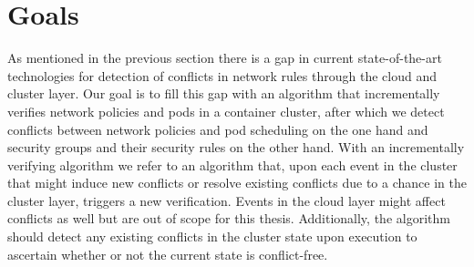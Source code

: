 \section{Goals} \label{sec:goals}
As mentioned in the previous section there is a gap in current state-of-the-art technologies for detection of conflicts in network rules through the cloud and cluster layer. Our goal is to fill this gap with an algorithm that incrementally verifies network policies and pods in a container cluster, after which we detect conflicts between network policies and pod scheduling on the one hand and security groups and their security rules on the other hand. With an incrementally verifying algorithm we refer to an algorithm that, upon each event in the cluster that might induce new conflicts or resolve existing conflicts due to a chance in the cluster layer, triggers a new verification. Events in the cloud layer might affect conflicts as well but are out of scope for this thesis. Additionally, the algorithm should detect any existing conflicts in the cluster state upon execution to ascertain whether or not the current state is conflict-free.



